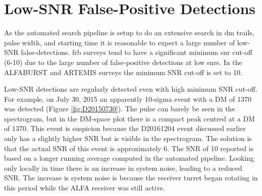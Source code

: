 \documentclass[a4paper,fleqn,usenatbib]{mnras}
\begin{document}
\section{Low-SNR False-Positive Detections}
\label{sec:low_snr}

As the automated search pipeline is setup to do an extensive search in \gls{dm}
trails, pulse width, and starting time it is reasonable to expect a large number
of low-SNR false-detections.  \gls{frb} surveys tend to have a significant
minimum \gls{snr} cut-off (6-10) due to the large number of false-positive
detections at low \glspl{snr}.  In the ALFABURST and ARTEMIS surveys the minimum
SNR cut-off is set to 10.

Low-SNR detections are regularly detected even with high minimum SNR cut-off.
For example, on July 30, 2015 an apparently 10-sigma event with a DM of 1370 was
detected (Figure \ref{fig:D20150730}). The pulse can barely be seen in the
spectrogram, but in the DM-space plot there is a compact peak centred at a DM of
1370. This event is suspicion because the D20161204 event discussed earlier only
has a slightly higher SNR but is visible in the spectrogram. The solution is
that the actual SNR of this event is approximately 6. The SNR of 10 reported is
based on a longer running average computed in the automated pipeline. Looking
only locally in time there is an increase in system noise, leading to a reduced
SNR. The increase is system noise is because the receiver turret began rotating
in this period while the ALFA receiver was still active.
\end{document}
